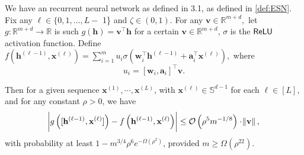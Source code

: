 \iffalse
\begin{corollary}\label{cor:singlecell_ESN}
	We have an recurrent neural network as defined in 3.1, as defined in \autoref{def:ESN}. Fix any $\ell \in\{0,1, \ldots, L-$ 1\} and $\zeta \in(0,1)$. For any $\mathbf{v} \in \mathbb{R}^{m + d},$ let $g: \mathbb{R}^{m + d} \rightarrow \mathbb{R}$ is such $g(\mathbf{h}) = \mathbf{v}^{\top} \mathbf{h}$ for a certain $\mathbf{v} \in \mathbb{R}^{m + d}$, $\sigma$ is the $\mathsf{ReLU}$ activation function.
	Define $f\left(\mathbf{h}^{(\ell-1)}, \mathbf{x}^{(\ell)}\right) = \sum_{i=1}^{m} u_i \sigma\left(\mathbf{w}_i^{\top} \mathbf{h}^{(\ell-1)} +  \mathbf{a}_i^{\top} \mathbf{x}^{(\ell)} \right),$ where 
	$$ u_i = [\mathbf{w}_i, \mathbf{a}_i]^{\top} \mathbf{v}.$$
	
	Then for a given sequence $\mathbf{x}^{(1)}, \cdots, \mathbf{x}^{(L)}$, with $\mathbf{x}^{(\ell)} \in \mathbb{S}^{d-1}$ for each $\ell \in [L]$, and for any constant $\rho > 0$, we have 
	\begin{equation*} \abs{g\left([\mathbf{h}^{(\ell-1)}, \mathbf{x}^{(\ell)}]\right) - f\left(\mathbf{h}^{(\ell-1)}, \mathbf{x}^{(\ell)}\right)} \le \mathcal{O}\left( \rho^5 m^{-1/8} \right) \cdot \norm{\mathbf{v}},
	\end{equation*}
	with probability at least $1 - m^{3/4} \rho^6 e^{-\Omega(\rho^2)}$, provided $m \ge \Omega(\rho^{22})$.
	
\end{corollary}

